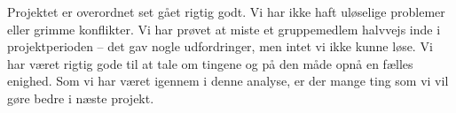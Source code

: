 Projektet er overordnet set gået rigtig godt. Vi har ikke haft uløselige problemer eller grimme konflikter. Vi har prøvet at miste et gruppemedlem halvvejs inde i projektperioden – det gav nogle udfordringer, men intet vi ikke kunne løse. Vi har været rigtig gode til at tale om tingene og på den måde opnå en fælles enighed. Som vi har været igennem i denne analyse, er der mange ting som vi vil gøre bedre i næste projekt.